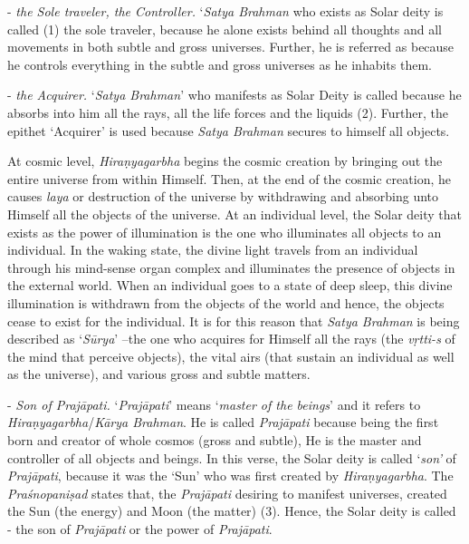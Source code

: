  - \emph{the Sole traveler, the Controller.} `\emph{Satya Brahman} who exists as Solar deity is called  (1) the sole traveler, because he alone exists behind all thoughts and all movements in both subtle and gross universes. Further, he is referred as  because he controls everything in the subtle and gross universes as he inhabits them.
\vskip 2pt

- \emph{the Acquirer.} `\emph{Satya Brahman}' who manifests as Solar Deity is called  because he absorbs into him all the rays, all the life forces and the liquids (2). Further, the epithet `Acquirer' is used because \emph{Satya Brahman} secures to himself all objects.
\vskip 2pt

At cosmic level, \emph{Hiraṇyagarbha} begins the cosmic creation by bringing out the entire universe from within Himself. Then, at the end of the cosmic creation, he causes \emph{laya} or destruction of the universe by withdrawing and absorbing unto Himself all the objects of the universe. At an individual level, the Solar deity that exists as the power of illumination is the one who illuminates all objects to an individual. In the waking state, the divine light travels from an individual through his mind-sense organ complex and illuminates the presence of objects in the external world. When an individual goes to a state of deep sleep, this divine illumination is withdrawn from the objects of the world and hence, the objects cease to exist for the individual. It is for this reason that \emph{Satya Brahman} is being described as `\emph{Sūrya}' --the one who acquires for Himself all the rays (the \emph{vṛtti-s} of the mind that perceive objects), the vital airs (that sustain an individual as well as the universe), and various gross and subtle matters.
\vskip 2pt

- \emph{Son of Prajāpati.} `\emph{Prajāpati}' means `\emph{master of the beings}' and it refers to \emph{Hiraṇyagarbha}/\emph{Kārya Brahman}. He is called \emph{Prajāpati} because being the first born and creator of whole cosmos (gross and subtle), He is the master and controller of all objects and beings. In this verse, the Solar deity is called `\emph{son'} of \emph{Prajāpati}, because it was the `Sun' who was first created by \emph{Hiraṇyagarbha}. The \emph{Praśnopaniṣad} states that, the \emph{Prajāpati} desiring to manifest universes, created the Sun (the energy) and Moon (the matter) (3). Hence, the Solar deity is called - the son of \emph{Prajāpati} or the power of \emph{Prajāpati}.


